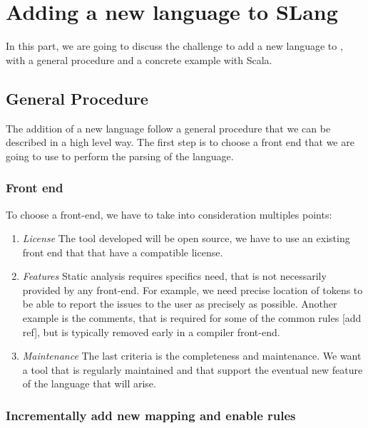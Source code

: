 \section{Adding a new language to SLang}
\label{sec:new_language}

In this part, we are going to discuss the challenge to add a new language to \slang, with a general procedure and a concrete example with Scala.

\subsection{General Procedure}
\label{subsec:general_procedure}

The addition of a new language follow a general procedure that we can be described in a high level way. 
The first step is to choose a front end that we are going to use to perform the parsing of the language. 

\subsubsection{Front end}
\label{subsubsec:front_end}

To choose a front-end, we have to take into consideration multiples points:
\begin{enumerate}
	\item \textit{License} \newline The tool developed will be open source, we have to use an existing front end that that have a compatible license.
	\item \textit{Features} \newline Static analysis requires specifics need, that is not necessarily provided by any front-end. 	For example, we need precise location of tokens to be able to report the issues to the user as precisely as possible. Another example is the comments, that is required for some of the common rules [add ref], but is typically removed early in a compiler front-end. 
	\item \textit{Maintenance} \newline 
	The last criteria is the completeness and maintenance. We want a tool that is regularly maintained and that support the eventual new feature of the language that will arise. 
\end{enumerate}

\subsubsection{Incrementally add new mapping and enable rules}
\label{subsubsec:new_mapping_and_enables_rules}

